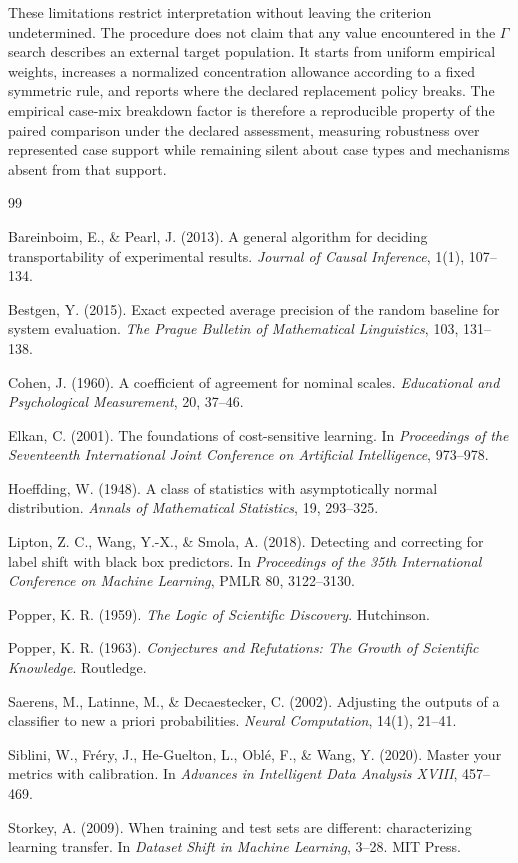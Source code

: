 \documentclass[11pt]{article}
\theoremstyle{remark}
\begin{document}
These limitations restrict interpretation without leaving the criterion
undetermined. The procedure does not claim that any value encountered in the
$\Gamma$ search describes an external target population. It starts from uniform
empirical weights, increases a normalized concentration allowance according to
a fixed symmetric rule, and reports where the declared replacement policy
breaks. The empirical case-mix breakdown factor is therefore a reproducible
property of the paired comparison under the declared assessment, measuring
robustness over represented case support while remaining silent about case
types and mechanisms absent from that support.


\begin{thebibliography}{99}

Bareinboim, E., \& Pearl, J. (2013).
A general algorithm for deciding transportability of experimental results.
\emph{Journal of Causal Inference}, 1(1), 107--134.

Bestgen, Y. (2015).
Exact expected average precision of the random baseline for system evaluation.
\emph{The Prague Bulletin of Mathematical Linguistics}, 103, 131--138.

Cohen, J. (1960).
A coefficient of agreement for nominal scales.
\emph{Educational and Psychological Measurement}, 20, 37--46.

Elkan, C. (2001).
The foundations of cost-sensitive learning.
In \emph{Proceedings of the Seventeenth International Joint Conference on Artificial Intelligence}, 973--978.

Hoeffding, W. (1948).
A class of statistics with asymptotically normal distribution.
\emph{Annals of Mathematical Statistics}, 19, 293--325.

Lipton, Z. C., Wang, Y.-X., \& Smola, A. (2018).
Detecting and correcting for label shift with black box predictors.
In \emph{Proceedings of the 35th International Conference on Machine Learning}, PMLR 80, 3122--3130.

Popper, K. R. (1959).
\emph{The Logic of Scientific Discovery}.
Hutchinson.

Popper, K. R. (1963).
\emph{Conjectures and Refutations: The Growth of Scientific Knowledge}.
Routledge.

Saerens, M., Latinne, M., \& Decaestecker, C. (2002).
Adjusting the outputs of a classifier to new a priori probabilities.
\emph{Neural Computation}, 14(1), 21--41.

Siblini, W., Fr\'ery, J., He-Guelton, L., Obl\'e, F., \& Wang, Y. (2020).
Master your metrics with calibration.
In \emph{Advances in Intelligent Data Analysis XVIII}, 457--469.

Storkey, A. (2009).
When training and test sets are different: characterizing learning transfer.
In \emph{Dataset Shift in Machine Learning}, 3--28. MIT Press.

\end{thebibliography}
\end{document}
